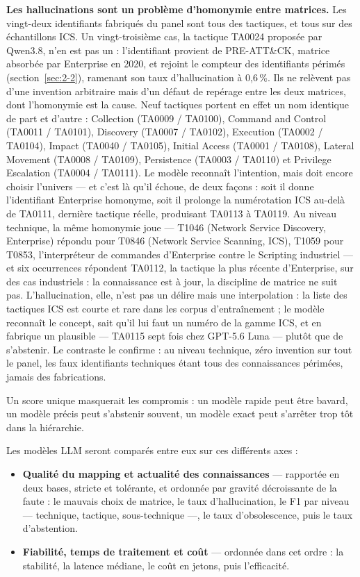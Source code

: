 \textbf{Les hallucinations sont un problème d'homonymie entre matrices.} Les vingt-deux identifiants fabriqués du panel sont tous des tactiques, et tous sur des échantillons ICS. Un vingt-troisième cas, la tactique TA0024 proposée par Qwen3.8, n'en est pas un : l'identifiant provient de PRE-ATT\&CK, matrice absorbée par Enterprise en 2020, et rejoint le compteur des identifiants périmés (section~\ref{sec:2-2}), ramenant son taux d'hallucination à 0,6\,\%. Ils ne relèvent pas d'une invention arbitraire mais d'un défaut de repérage entre les deux matrices, dont l'homonymie est la cause. Neuf tactiques portent en effet un nom identique de part et d'autre : Collection (TA0009 / TA0100), Command and Control (TA0011 / TA0101), Discovery (TA0007 / TA0102), Execution (TA0002 / TA0104), Impact (TA0040 / TA0105), Initial Access (TA0001 / TA0108), Lateral Movement (TA0008 / TA0109), Persistence (TA0003 / TA0110) et Privilege Escalation (TA0004 / TA0111). Le modèle reconnaît l'intention, mais doit encore choisir l'univers --- et c'est là qu'il échoue, de deux façons : soit il donne l'identifiant Enterprise homonyme, soit il prolonge la numérotation ICS au-delà de TA0111, dernière tactique réelle, produisant TA0113 à TA0119. Au niveau technique, la même homonymie joue --- T1046 (Network Service Discovery, Enterprise) répondu pour T0846 (Network Service Scanning, ICS), T1059 pour T0853, l'interpréteur de commandes d'Enterprise contre le Scripting industriel --- et six occurrences répondent TA0112, la tactique la plus récente d'Enterprise, sur des cas industriels : la connaissance est à jour, la discipline de matrice ne suit pas. L'hallucination, elle, n'est pas un délire mais une interpolation : la liste des tactiques ICS est courte et rare dans les corpus d'entraînement ; le modèle reconnaît le concept, sait qu'il lui faut un numéro de la gamme ICS, et en fabrique un plausible --- TA0115 sept fois chez GPT-5.6 Luna --- plutôt que de s'abstenir. Le contraste le confirme : au niveau technique, zéro invention sur tout le panel, les faux identifiants techniques étant tous des connaissances périmées, jamais des fabrications.

Un score unique masquerait les compromis : un modèle rapide peut être bavard, un modèle précis peut s'abstenir souvent, un modèle exact peut s'arrêter trop tôt dans la hiérarchie.

Les modèles LLM seront comparés entre eux sur ces différents axes :

\begin{itemize}
\item
  \textbf{Qualité du mapping et actualité des connaissances} --- rapportée en deux bases, stricte et tolérante, et ordonnée par gravité décroissante de la faute : le mauvais choix de matrice, le taux d'hallucination, le F1 par niveau --- technique, tactique, sous-technique ---, le taux d'obsolescence, puis le taux d'abstention.
\item
  \textbf{Fiabilité, temps de traitement et coût} --- ordonnée dans cet ordre : la stabilité, la latence médiane, le coût en jetons, puis l'efficacité.
\end{itemize}

